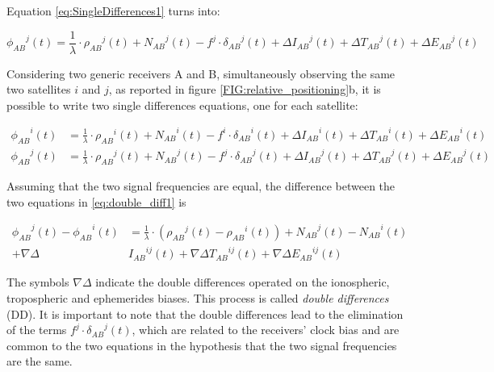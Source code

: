 Equation \ref{eq:SingleDifferences1} turns into:

\begin{equation}
	{\phi_{AB}}^{j}(t)=\frac{1}{\lambda}\cdot {\rho_{AB}}^{j}(t)+{N_{AB}}^{j}(t)-f^{j}\cdot{\delta_{AB}}^{j}(t)+\Delta {I_{AB}}^{j}(t)+\Delta {T_{AB}}^{j}(t)+\Delta {E_{AB}}^{j}(t)
	\label{eq:double_diff0}
\end{equation}

Considering two generic receivers A and B, simultaneously observing the same two satellites $i $ and $j$, as reported in figure \ref{FIG:relative_positioning}b, it is possible to write two single differences equations, one for each satellite:

\begin{equation} 
	\begin{split} 
		{\phi_{AB}}^{i}(t)&=\frac{1}{\lambda}\cdot {\rho_{AB}}^{i}(t)+{N_{AB}}^{i}(t)-f^{i}\cdot{\delta_{AB}}^{i}(t)+\Delta {I_{AB}}^{i}(t)+\Delta {T_{AB}}^{i}(t)+\Delta {E_{AB}}^{i}(t)\\ {\phi_{AB}}^{j}(t)&=\frac{1}{\lambda}\cdot {\rho_{AB}}^{j}(t)+{N_{AB}}^{j}(t)-f^{j}\cdot{\delta_{AB}}^{j}(t)+\Delta {I_{AB}}^{j}(t)+\Delta {T_{AB}}^{j}(t)+\Delta {E_{AB}}^{j}(t)  
		\label{eq:double_diff1}
	\end{split}
\end{equation}

Assuming that the two signal frequencies are equal, the difference between the two equations in \ref{eq:double_diff1} is

\begin{equation} 
	\begin{split}
		{\phi_{AB}}^{j}(t)-{\phi_{AB}}^{i}(t) & = \frac{1}{\lambda}\cdot \left({\rho_{AB}}^{j}(t)-{\rho_{AB}}^{i}(t)\right)+{N_{AB}}^{j}(t)- {N_{AB}}^{i}(t) \\ + \nabla\Delta & {I_{AB}}^{ij}(t)  + \nabla \Delta {T_{AB}}^{ij}(t)+\nabla \Delta {E_{AB}}^{ij}(t)
		\label{eq:double_diff2}
	\end{split}
\end{equation}

The symbols $\nabla \Delta$ indicate the double differences operated on the ionospheric, tropospheric and ephemerides biases. This process is called \textit{double differences} (DD). It is important to note that the double differences lead to the elimination of the terms $f^{j}\cdot {\delta_{AB}}^{j}(t)$, which are related to the receivers’ clock bias and are common to the two equations in the hypothesis that the two signal frequencies are the same.

